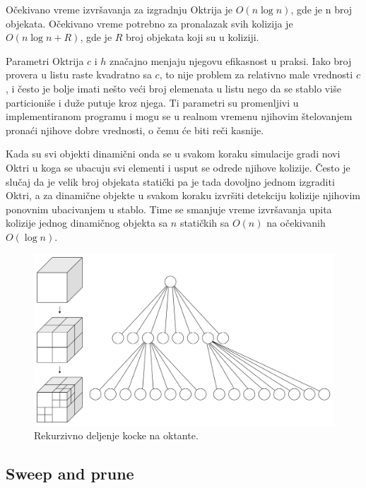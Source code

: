 \documentclass{article}
\begin{document}
{Očekivano vreme izvršavanja za izgradnju Oktrija je $O(n \log n)$, gde je n broj objekata.
Očekivano vreme potrebno za pronalazak svih kolizija je $O(n \log n + R)$, gde je $R$ broj objekata koji su u koliziji.

Parametri Oktrija $c$ i $h$ značajno menjaju njegovu efikasnost u praksi. 
Iako broj provera u listu raste kvadratno sa $c$, to nije problem za relativno male vrednosti $c$, i često je bolje 
imati nešto veći broj elemenata u listu nego da se stablo više particioniše i duže putuje kroz njega.
Ti parametri su promenljivi u implementiranom programu i mogu se u realnom vremenu njihovim štelovanjem pronaći 
njihove dobre vrednosti, o čemu će biti reči kasnije.

Kada su svi objekti dinamični onda se u svakom koraku simulacije  gradi novi Oktri u
koga se ubacuju svi elementi i usput se odrede njihove kolizije. Često je slučaj da je velik 
broj objekata statički pa je tada dovoljno jednom izgraditi Oktri, a za dinamične objekte u svakom koraku 
izvršiti detekciju kolizije njihovim ponovnim ubacivanjem u stablo. Time se smanjuje vreme izvršavanja upita 
kolizije jednog dinamičnog objekta sa $n$ statičkih sa $O(n)$ na očekivanih $O(\log n)$.


\begin{figure}[h!]
	\begin{center}
	\includegraphics[scale=0.15]{octree.png}
	\end{center}
	\caption{Rekurzivno deljenje kocke na oktante.}
	\label{fig:oct}
\end{figure}



\subsection{Sweep and prune}
\label{subsec:sap}




}
\end{document}

